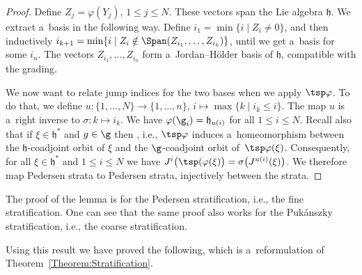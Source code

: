 \begin{proof}
 Define $Z_j = \varphi(Y_j)$, $1\leq j \leq N$. These vectors span the Lie algebra $\mathfrak{h}$. We extract a~basis in the following way. Define $i_1 = \min\{i\mid Z_i \neq 0\}$,
 and then inductively $i_{k+1} = \min\{i \mid Z_i \notin \Span(Z_{i_1},\dots, Z_{i_k})\}$,
 until we get a~basis for some $i_n$.
 The vectors $Z_{i_1}, \dots, Z_{i_n}$ form a~Jordan--H\"older basis of $\mathfrak{h}$, compatible with the grading.

 We now want to relate jump indices for the two bases when we apply $\tsp\varphi$. To do that, we define
$u \colon  \{1,\dots,N\}  \to \{1,\dots,n\}$, $ i \mapsto \max\{k\mid i_k \leq i\}$.
 The map $u$ is a~right inverse to $\sigma \colon k \mapsto i_k$. We have $\varphi(\g_i) = \mathfrak{h}_{u(i)}$ for all $1\leq i \leq N$. Recall also that if $\xi \in \mathfrak{h}^*$ and $g \in \g$ then ,
 i.e., $\tsp\varphi$ induces a~homeomorphism between the $\mathfrak{h}$-coadjoint orbit of $\xi$ and the $\g$-coadjoint orbit of~$\tsp\varphi(\xi)$.
 Consequently, for all $\xi \in \mathfrak{h}^*$ and $1\leq i \leq N$ we have $J^i\bigl(\tsp(\varphi(\xi)\bigr) = \sigma\bigl(J^{u(i)}(\xi)\bigr)$.
 We therefore map Pedersen strata to Pedersen strata, injectively between the strata.
\end{proof}

\begin{rem}
 The proof of the lemma is for the Pedersen stratification, i.e., the fine stratification. One can see that the same proof also works for the Puk\'anszky stratification, i.e., the coarse stratification.
\end{rem}

Using this result we have proved the following, which is a~reformulation of Theorem~\ref{Theorem:Stratification}.

